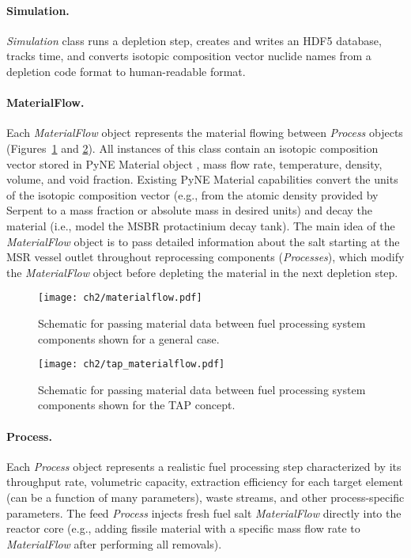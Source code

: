 \paragraph*{Simulation.}\textit{Simulation} class runs a depletion 
step, creates and writes an HDF5 database, tracks time, and converts isotopic 
composition vector nuclide names from a depletion code format to 
human-readable format.
\paragraph*{MaterialFlow.}Each \textit{MaterialFlow} object represents the 
material flowing between \textit{Process} objects  
(Figures~\ref{fig:matflow_obj} and \ref{fig:matflow_obj_tap}). All instances 
of this class contain an isotopic composition vector stored in PyNE Material 
object \cite{scopatz_pyne_2012}, mass flow rate, temperature, density, volume, 
and void fraction. 
Existing PyNE Material capabilities convert the units of the isotopic 
composition vector (e.g., from the atomic density provided by Serpent to a 
mass fraction or absolute mass in desired units) and decay the material (i.e., 
model the \gls{MSBR} protactinium decay tank). The main idea of the 
\textit{MaterialFlow} object is to pass detailed information about the salt 
starting at the \gls{MSR} vessel outlet throughout reprocessing components 
(\textit{Processes}), which modify the \textit{MaterialFlow} object before 
depleting the material in the next depletion step. 
\begin{figure}[ht!] %
	\centering
	\texttt{[image: ch2/materialflow.pdf]}
	\caption{Schematic for passing material data between fuel processing 
		system components shown for a general case.}
	\label{fig:matflow_obj}
\end{figure}
\begin{figure}[ht!] %
	\centering
	\texttt{[image: ch2/tap\_materialflow.pdf]}
	\caption{Schematic for passing material data between fuel processing 
		system components shown for the \gls{TAP} concept.}
	\label{fig:matflow_obj_tap}
\end{figure}

\paragraph*{Process.}Each \textit{Process} object represents a 
realistic fuel processing step characterized by its throughput rate, 
volumetric capacity, extraction efficiency for each target element (can be 
a function of many parameters), waste streams, and other process-specific 
parameters. The feed \textit{Process} injects fresh fuel salt 
\textit{MaterialFlow} directly into the reactor core (e.g., adding fissile 
material with a specific mass flow rate to \textit{MaterialFlow} after 
performing all removals).\\


